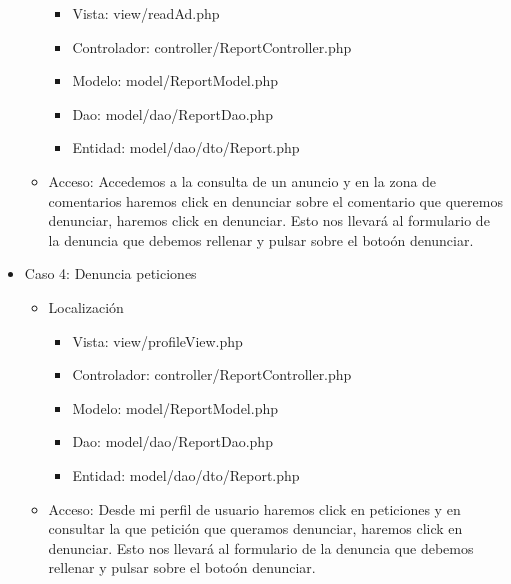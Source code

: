 \begin{itemize}
\begin{itemize}
\begin{itemize}
\item Vista: view/readAd.php
\item Controlador: controller/ReportController.php
\item Modelo: model/ReportModel.php
\item Dao: model/dao/ReportDao.php
\item Entidad: model/dao/dto/Report.php
\end{itemize}
\item Acceso: Accedemos a la consulta de un anuncio y en la zona de comentarios haremos click en denunciar sobre el comentario que queremos denunciar, haremos click en denunciar. Esto nos llevar\'{a} al formulario de la denuncia que debemos rellenar y pulsar sobre el boto\'{o}n denunciar. 
\end{itemize}
\item Caso 4: Denuncia peticiones
\begin{itemize}
\item Localizaci\'{o}n
\begin{itemize}
\item Vista: view/profileView.php
\item Controlador: controller/ReportController.php
\item Modelo: model/ReportModel.php
\item Dao: model/dao/ReportDao.php
\item Entidad: model/dao/dto/Report.php
\end{itemize}
\item Acceso: Desde mi perfil de usuario haremos click en peticiones y en consultar la que petici\'{o}n que queramos denunciar, haremos click en denunciar. Esto nos llevar\'{a} al formulario de la denuncia que debemos rellenar y pulsar sobre el boto\'{o}n denunciar.
\end{itemize}
\end{itemize}
